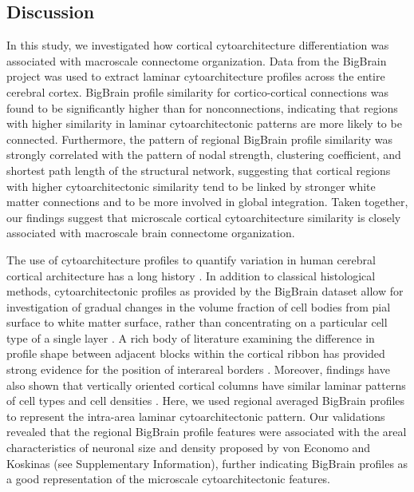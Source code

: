 \begin{refsection}
\section*{Discussion}
In this study, we investigated how cortical cytoarchitecture differentiation was associated with macroscale connectome organization. Data from the BigBrain project was used to extract laminar cytoarchitecture profiles across the entire cerebral cortex. BigBrain profile similarity for cortico-cortical connections was found to be significantly higher than for nonconnections, indicating that regions with higher similarity in laminar cytoarchitectonic patterns are more likely to be connected. Furthermore, the pattern of regional BigBrain profile similarity was strongly correlated with the pattern of nodal strength, clustering coefficient, and shortest path length of the structural network, suggesting that cortical regions with higher cytoarchitectonic similarity tend to be linked by stronger white matter connections and to be more involved in global integration. Taken together, our findings suggest that microscale cortical cytoarchitecture similarity is closely associated with macroscale brain connectome organization.

The use of cytoarchitecture profiles to quantify variation in human cerebral cortical architecture has a long history \citep{HAUG1956,MACKEY20091089,SCHLEICHER1986221,Schleicher2009,WREE198229}. In addition to classical histological methods, cytoarchitectonic profiles as provided by the BigBrain dataset allow for investigation of gradual changes in the volume fraction of cell bodies from pial surface to white matter surface, rather than concentrating on a particular cell type of a single layer \citep{Amunts2015ArchitectonicMO}. A rich body of literature examining the difference in profile shape between adjacent blocks within the cortical ribbon has provided strong evidence for the position of interareal borders \citep{Caspers2012CytoarchitectonicalAA,Schleicher2009,Schleicher1999ObserverIndependentMF,Schleicher2000ASA,Kujovic2012CytoarchitectonicMO}. Moreover, findings have also shown that vertically oriented cortical columns have similar laminar patterns of cell types and cell densities \citep{Zilles2010CentenaryOB}. Here, we used regional averaged BigBrain profiles to represent the intra-area laminar cytoarchitectonic pattern. Our validations revealed that the regional BigBrain profile features were associated with the areal characteristics of neuronal size and density proposed by von Economo and Koskinas (see Supplementary Information), further indicating BigBrain profiles as a good representation of the microscale cytoarchitectonic features.


\end{refsection}
